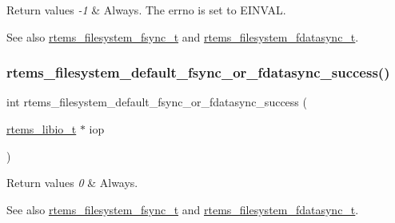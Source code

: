 \begin{DoxyRetVals}{Return values}
{\em -\/1} & Always. The errno is set to E\+I\+N\+V\+AL.\\
\hline
\end{DoxyRetVals}
\begin{DoxySeeAlso}{See also}
\mbox{\hyperlink{group__LibIOFSHandler_gace838c9c108ef6f2e7ddeed186a369f5}{rtems\+\_\+filesystem\+\_\+fsync\+\_\+t}} and \mbox{\hyperlink{group__LibIOFSHandler_gad78b9605ac97be914b586f3a2820a3de}{rtems\+\_\+filesystem\+\_\+fdatasync\+\_\+t}}. 
\end{DoxySeeAlso}
\mbox{\label{group__LibIOFSHandler_ga9447b9dc7947e64bde539307a8c0cdb5}} 
\subsubsection{\texorpdfstring{rtems\_filesystem\_default\_fsync\_or\_fdatasync\_success()}{rtems\_filesystem\_default\_fsync\_or\_fdatasync\_success()}}
{\footnotesize\ttfamily int rtems\+\_\+filesystem\+\_\+default\+\_\+fsync\+\_\+or\+\_\+fdatasync\+\_\+success (\begin{DoxyParamCaption}\item[{\mbox{\hyperlink{structrtems__libio__tt}{rtems\+\_\+libio\+\_\+t}} $\ast$}]{iop }\end{DoxyParamCaption})}


\begin{DoxyRetVals}{Return values}
{\em 0} & Always.\\
\hline
\end{DoxyRetVals}
\begin{DoxySeeAlso}{See also}
\mbox{\hyperlink{group__LibIOFSHandler_gace838c9c108ef6f2e7ddeed186a369f5}{rtems\+\_\+filesystem\+\_\+fsync\+\_\+t}} and \mbox{\hyperlink{group__LibIOFSHandler_gad78b9605ac97be914b586f3a2820a3de}{rtems\+\_\+filesystem\+\_\+fdatasync\+\_\+t}}. 
\end{DoxySeeAlso}
\mbox{\label{group__LibIOFSHandler_ga10a3664ce71afda3d60d6889a0c84367}} 
